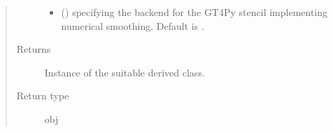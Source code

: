 \documentclass[letterpaper,10pt,english]{sphinxmanual}
\begin{document}
\begin{fulllineitems}
\begin{fulllineitems}
\begin{quote}
\begin{description}
\begin{itemize}
\item {} 
 () \textendash{}  specifying the backend for the GT4Py stencil implementing numerical
smoothing. Default is .

\end{itemize}

\item[{Returns}] \leavevmode
Instance of the suitable derived class.

\item[{Return type}] \leavevmode
obj

\end{description}\end{quote}

\end{fulllineitems}


\end{fulllineitems}

\end{document}

